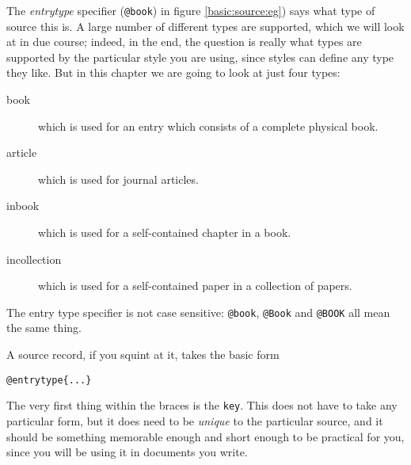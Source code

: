 The \emph{entrytype} specifier (\verb|@book|) in figure \ref{basic:source:eg}) says what type of source this is. A large number of different types are supported, which we will look at in due course; indeed, in the end, the question is really what types are supported by the particular style you are using, since styles can define any type they like. But in this chapter we are going to look at just four types:
\begin{description}
\item[book] which is used for an entry which consists of a complete physical book.
\item[article] which is used for journal articles.
\item[inbook] which is used for a self-contained chapter in a book.
\item[incollection] which is used for a self-contained paper in a collection of papers.
\end{description}

The entry type specifier is not case sensitive: \verb|@book|, \verb|@Book| and \verb|@BOOK| all mean the same thing.

A source record, if you squint at it, takes the basic form
\begin{center}\verb|@entrytype{...}|\end{center}The very first thing within the braces is the \verb|key|. This does not have to take any particular form, but it does need to be \emph{unique} to the particular source, and it should be something memorable enough and short enough to be practical for you, since you will be using it in documents you write.

